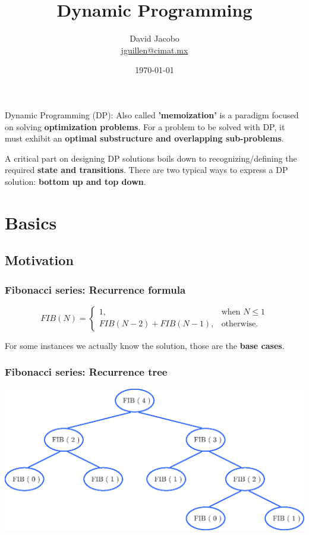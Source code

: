 \documentclass[article]{beamer}
\title{Dynamic Programming}
\author{David Jacobo \\ \href{mailto:jguillen@cimat.mx}{jguillen@cimat.mx}}
\date{\scriptsize{\today}}
\begin{document}
\maketitle

\begin{frame}
\begin{block}{Dynamic Programming (DP):}
	Also called \textbf{'memoization'} is a paradigm focused on solving \textbf{optimization 
	problems}. For a problem to be solved with DP, it must exhibit an \textbf{optimal substructure and
	overlapping sub-problems}.
	
	\vspace{8mm}
	
	A critical part on designing DP solutions boils down to recognizing/defining the 
	required \textbf{state and transitions}. There are two typical ways to express a DP solution: \textbf{bottom up and top down}.
\end{block}
\end{frame}


\section{Basics}

\subsection{Motivation}
\begin{frame}
	\frametitle{Fibonacci series: Recurrence formula}
	\begin{equation}
		FIB(N)=\begin{cases}
		1, & \text{when } N \leq 1 \\
		FIB(N-2) + FIB(N-1), & \text{otherwise.}
		\end{cases}
	\end{equation}
	
	\vspace{8mm}
	
	For some instances we actually know the solution, those are the \textbf{base cases}.
\end{frame}

\begin{frame}
	\frametitle{Fibonacci series: Recurrence tree}
	\begin{center}
		\includegraphics[scale=0.7]{./figures/fib.eps}
	\end{center}
\end{frame}
\end{document}
